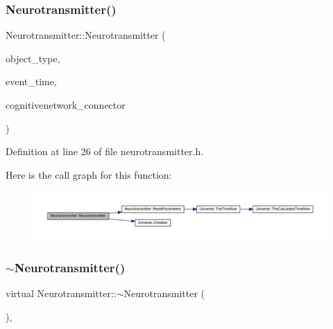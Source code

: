 \subsubsection{\texorpdfstring{Neurotransmitter()}{Neurotransmitter()}\hspace{0.1cm}{\footnotesize\ttfamily [4/4]}}
{\footnotesize\ttfamily Neurotransmitter\+::\+Neurotransmitter (\begin{DoxyParamCaption}\item[{unsigned int}]{object\+\_\+type,  }\item[{std\+::chrono\+::time\+\_\+point$<$ \hyperlink{universe_8h_a0ef8d951d1ca5ab3cfaf7ab4c7a6fd80}{Clock} $>$}]{event\+\_\+time,  }\item[{\hyperlink{class_cognitive_network}{Cognitive\+Network} \&}]{cognitivenetwork\+\_\+connector }\end{DoxyParamCaption})\hspace{0.3cm}{\ttfamily [inline]}}



Definition at line 26 of file neurotransmitter.\+h.

Here is the call graph for this function\+:
\nopagebreak
\begin{figure}[H]
\begin{center}
\leavevmode
\includegraphics[width=350pt]{class_neurotransmitter_ac9257a1b310a26eba8a08ffb4b93bb64_cgraph}
\end{center}
\end{figure}
\mbox{\label{class_neurotransmitter_a0ea63f67dc5a49d485b7a7034a8f7968}} 
\subsubsection{\texorpdfstring{$\sim$\+Neurotransmitter()}{~Neurotransmitter()}}
{\footnotesize\ttfamily virtual Neurotransmitter\+::$\sim$\+Neurotransmitter (\begin{DoxyParamCaption}{ }\end{DoxyParamCaption})\hspace{0.3cm}{\ttfamily [inline]}, {\ttfamily [virtual]}}

